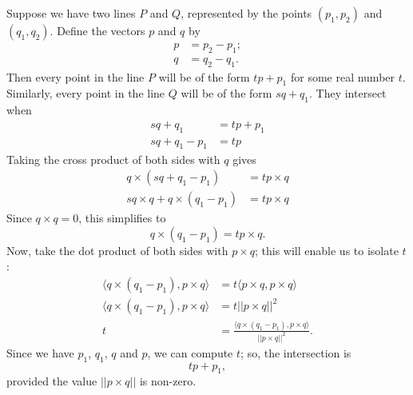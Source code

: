 \documentclass{article}
\begin{document}
Suppose we have two lines $P$ and $Q$,
represented by the points $(p_1, p_2)$ and $(q_1, q_2)$.
Define the vectors $p$ and $q$ by
\begin{align*}
    p &= p_2 - p_1; \\
    q &= q_2 - q_1.
\end{align*}
Then every point in the line $P$ will be of the form $tp + p_1$
for some real number $t$.
Similarly, every point in the line $Q$ will be of the form $sq + q_1$.
They intersect when
\begin{align*}
    sq + q_1 &= tp + p_1 \\
    sq + q_1 - p_1 &= tp
\end{align*}
Taking the cross product of both sides with $q$ gives
\begin{align*}
    q \times (sq + q_1 - p_1) &= t p \times q \\
    s q \times q + q \times (q_1 - p_1) &= t p \times q
\end{align*}
Since $q \times q = 0$, this simplifies to
\begin{equation*}
    q \times (q_1 - p_1) = t p \times q.
\end{equation*}
Now, take the dot product of both sides with $p \times q$;
this will enable us to isolate $t$:
\begin{align*}
    \langle q \times (q_1 - p_1), p \times q \rangle
        &= t \langle p \times q, p \times q \rangle \\
    \langle q \times (q_1 - p_1), p \times q \rangle &= t ||p \times q||^2 \\
    t &= \frac{\langle q \times(q_1 - p_1), p \times q \rangle}{||p \times q||^2}.
\end{align*}
Since we have $p_1$, $q_1$, $q$ and $p$, we can compute $t$;
so, the intersection is
\begin{equation*}
    tp + p_1,
\end{equation*}
provided the value $|| p \times q ||$ is non-zero.
\end{document}
